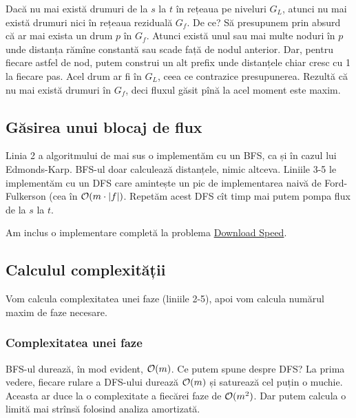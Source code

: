 \documentclass[../main.tex]{subfiles}
\begin{document}
Dacă nu mai există drumuri de la $s$ la $t$ în rețeaua pe niveluri $G_L$, atunci nu mai există drumuri nici în rețeaua reziduală $G_f$. De ce? Să presupunem prin absurd că ar mai exista un drum $p$ în $G_f$. Atunci există unul sau mai multe noduri în $p$ unde distanța rămîne constantă sau scade față de nodul anterior. Dar, pentru fiecare astfel de nod, putem construi un alt prefix unde distanțele chiar cresc cu 1 la fiecare pas. Acel drum ar fi în $G_L$, ceea ce contrazice presupunerea. Rezultă că nu mai există drumuri în $G_f$, deci fluxul găsit pînă la acel moment este maxim.

\subsection{Găsirea unui blocaj de flux}

Linia 2 a algoritmului de mai sus o implementăm cu un BFS, ca și în cazul lui Edmonds-Karp. BFS-ul doar calculează distanțele, nimic altceva. Liniile 3-5 le implementăm cu un DFS care amintește un pic de implementarea naivă de Ford-Fulkerson (cea în $\mathcal{O}(m\cdot |f|)$. Repetăm acest DFS cît timp mai putem pompa flux de la $s$ la $t$.

Am inclus o implementare completă la problema \hyperref[problem:download-speed]{Download Speed}.

\subsection{Calculul complexității}

Vom calcula complexitatea unei faze (liniile 2-5), apoi vom calcula numărul maxim de faze necesare.

\subsubsection*{Complexitatea unei faze}

BFS-ul durează, în mod evident, $\mathcal{O}(m)$. Ce putem spune despre DFS? La prima vedere, fiecare rulare a DFS-ului durează $\mathcal{O}(m)$ și saturează cel puțin o muchie. Aceasta ar duce la o complexitate a fiecărei faze de $\mathcal{O}(m^2)$. Dar putem calcula o limită mai strînsă folosind analiza amortizată.
\end{document}
